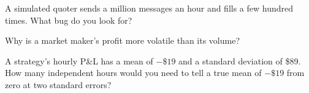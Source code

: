 \begin{interviewq}\label{iq:hf:the-business-of-market-making:4}
A simulated quoter sends a million messages an hour and fills a few hundred times. What bug do you look for?
\end{interviewq}

\begin{interviewq}\label{iq:hf:the-business-of-market-making:5}
Why is a market maker's profit more volatile than its volume?
\end{interviewq}

\begin{interviewq}\label{iq:hf:the-business-of-market-making:6}
A strategy's hourly P\&L has a mean of $-\$19$ and a standard deviation of \$89. How many independent hours would you need to tell a true mean of
$-\$19$ from zero at two standard errors?
\end{interviewq}
